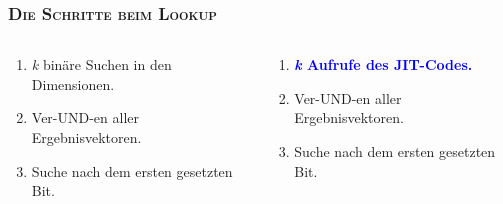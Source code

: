 \documentclass[xcolor=x11names,compress]{beamer}
\renewcommand{\(}{\begin{columns}}
\renewcommand{\)}{\end{columns}}
\newcommand{\<}[1]{\begin{column}{#1}}
\renewcommand{\>}{\end{column}}
\begin{document}
\begin{frame}
  \frametitle{\scshape Die Schritte beim Lookup}
  \begin{columns}[T] %
    \begin{column}{.48\textwidth}
    \begin{tcolorbox}[colback=red!5!white,colframe=red!75!black,title=Standard Bitvector,drop fuzzy shadow]
    \begin{enumerate}[label=\arabic*)]%
      \item \textit{k} binäre Suchen in den Dimensionen.
      \item Ver-UND-en aller Ergebnisvektoren.
      \item Suche nach dem ersten gesetzten Bit.
    \end{enumerate}
    \end{tcolorbox}
    \end{column}
    \hfill
    \begin{column}{.48\textwidth}
    \begin{tcolorbox}[colback=blue!5!white,colframe=blue!75!black,title=Bitvector mit JIT,drop fuzzy shadow]
    \begin{enumerate}[label=\arabic*)]%
      \item \textcolor{blue}{\textbf{\textit{k} Aufrufe des JIT-Codes.}}
      \item Ver-UND-en aller Ergebnisvektoren.
      \item Suche nach dem ersten gesetzten Bit.
    \end{enumerate}
    \end{tcolorbox}
    \end{column}
  \end{columns}
\end{frame}
\end{document}
